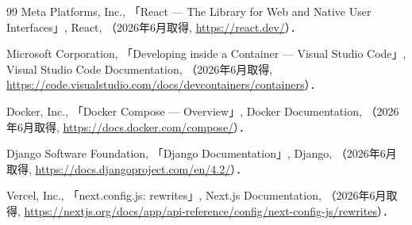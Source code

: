 \begin{thebibliography}{99}
Meta Platforms, Inc., 「React --- The Library for Web and Native User Interfaces」, React,
（2026年6月取得, \url{https://react.dev/}）．

Microsoft Corporation, 「Developing inside a Container --- Visual Studio Code」,
Visual Studio Code Documentation,
（2026年6月取得, \url{https://code.visualstudio.com/docs/devcontainers/containers}）．

Docker, Inc., 「Docker Compose --- Overview」, Docker Documentation,
（2026年6月取得, \url{https://docs.docker.com/compose/}）．

Django Software Foundation, 「Django Documentation」, Django,
（2026年6月取得, \url{https://docs.djangoproject.com/en/4.2/}）．

Vercel, Inc., 「next.config.js: rewrites」, Next.js Documentation,
（2026年6月取得, \url{https://nextjs.org/docs/app/api-reference/config/next-config-js/rewrites}）．

\end{thebibliography}
\endgroup
